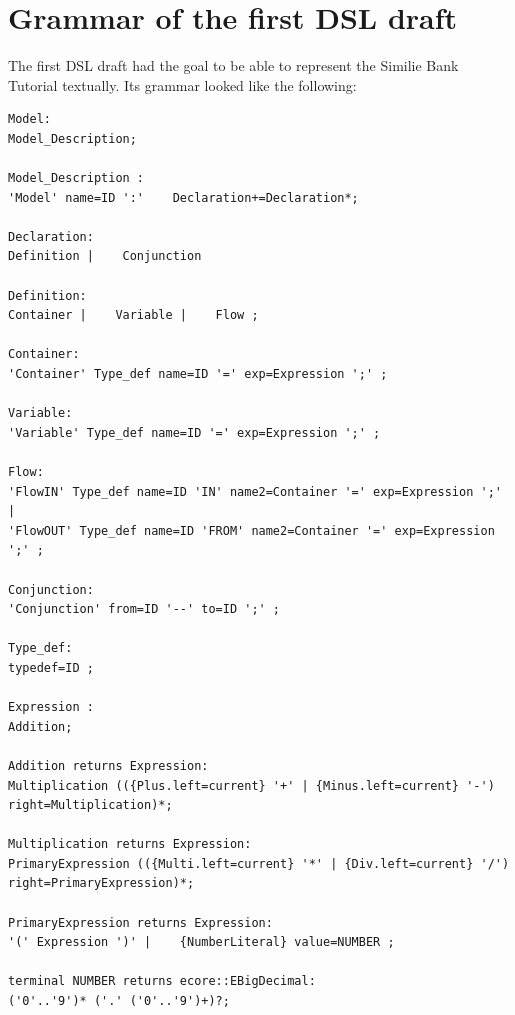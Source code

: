 \section{Grammar of the first DSL draft} \label{sec:first_dsl_draft}
\par
The first DSL draft had the goal to be able to represent the Similie Bank Tutorial \autocite{dsl:similie_tutorial_bank} textually. Its grammar looked like the following:
\begin{lstlisting}
Model:
Model_Description;

Model_Description :
'Model' name=ID ':'    Declaration+=Declaration*;

Declaration:
Definition |    Conjunction

Definition:
Container |    Variable |    Flow ;

Container:
'Container' Type_def name=ID '=' exp=Expression ';' ;

Variable:
'Variable' Type_def name=ID '=' exp=Expression ';' ;

Flow:
'FlowIN' Type_def name=ID 'IN' name2=Container '=' exp=Expression ';' |
'FlowOUT' Type_def name=ID 'FROM' name2=Container '=' exp=Expression ';' ;

Conjunction:
'Conjunction' from=ID '--' to=ID ';' ;

Type_def:
typedef=ID ;

Expression :
Addition;

Addition returns Expression:
Multiplication (({Plus.left=current} '+' | {Minus.left=current} '-') right=Multiplication)*;

Multiplication returns Expression:
PrimaryExpression (({Multi.left=current} '*' | {Div.left=current} '/') right=PrimaryExpression)*;

PrimaryExpression returns Expression:
'(' Expression ')' |    {NumberLiteral} value=NUMBER ;

terminal NUMBER returns ecore::EBigDecimal:
('0'..'9')* ('.' ('0'..'9')+)?;
\end{lstlisting}

